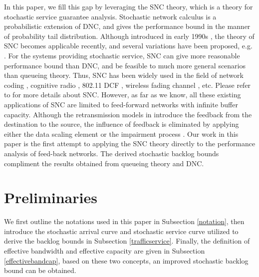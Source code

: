 \documentclass[paper]{ieice}
\begin{document}
In this paper, we fill this gap by leveraging the SNC theory, which is a theory for stochastic service guarantee analysis. Stochastic network calculus is a probabilistic extension of DNC, and gives the performance bound in the manner of probability tail distribution. Although introduced in early 1990s \cite{Chan94}, the theory of SNC becomes applicable recently, and several variations have been proposed, e.g. \cite{jiang2006basic,Fidl06,5984844,Ciucu2006Scaling}. For the systems providing stochastic service, SNC can give more reasonable performance bound than DNC, and be feasible to much more general scenarios than queueing theory. Thus, SNC has been widely used in the field of network coding \cite{10.1109/TPDS.2010.192}, cognitive radio \cite{5466711}, 802.11 DCF \cite{xie2010network}\cite{wang2012effectiveness}, wireless fading channel \cite{Fidler2006network,wangperformance}, etc. Please refer to \cite{JiangLiu-15877} for more details about SNC. However, as far as we know, all these existing applications of SNC are limited to feed-forward networks with infinite buffer capacity. Although the retransmission models in \cite{wangperformance,5466711} introduce the feedback from the destination to the source, the influence of feedback is eliminated by applying either the data scaling element \cite{wangperformance} or the impairment process \cite{5466711}. Our work in this paper is the first attempt to applying the SNC theory directly to the performance analysis of feed-back networks. The derived stochastic backlog bounds compliment the results obtained from queueing theory and DNC.

\section{Preliminaries}\label{Notations}
We first outline the notations used in this paper in Subsection \ref{notation}, then introduce the stochastic arrival curve and stochastic service curve utilized to derive the backlog bounds in Subsection \ref{trafficservice}. Finally, the definition of effective bandwidth and effective capacity are given in Subsection \ref{effectivebandcap}, based on these two concepts, an improved stochastic backlog bound can be obtained.
\end{document}
